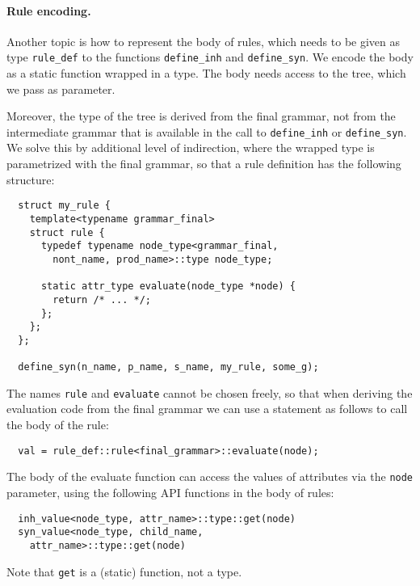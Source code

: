 \documentclass{llncs}
\begin{document}
  \paragraph{Rule encoding.}
  Another topic is how to represent the body of rules, which
  needs to be given as type \lstinline$rule_def$ to the
  functions \lstinline$define_inh$ and \lstinline$define_syn$.
  We encode the body as a static function wrapped in a type.
  The body needs access to the tree, which we pass as parameter.

  Moreover, the type of the tree is derived from the final
  grammar, not from the intermediate grammar that is available
  in the call to \lstinline$define_inh$ or \lstinline$define_syn$.
  We solve this by additional level of indirection, where the
  wrapped type is parametrized with the final grammar, so that
  a rule definition has the following structure:
  \begin{lstlisting}
  struct my_rule {
    template<typename grammar_final>
    struct rule {
      typedef typename node_type<grammar_final,
        nont_name, prod_name>::type node_type;

      static attr_type evaluate(node_type *node) {
        return /* ... */;
      };
    };
  };

  define_syn(n_name, p_name, s_name, my_rule, some_g);
  \end{lstlisting}
  The names \lstinline$rule$ and \lstinline$evaluate$
  cannot be chosen freely, so that when deriving the
  evaluation code from the final grammar
  we can use a statement as follows to call the
  body of the rule:
  \begin{lstlisting}
  val = rule_def::rule<final_grammar>::evaluate(node);
  \end{lstlisting}

  The body of the evaluate function can access the
  values of attributes via the \lstinline$node$
  parameter, using the following API functions
  in the body of rules:
  \begin{lstlisting}
  inh_value<node_type, attr_name>::type::get(node)
  syn_value<node_type, child_name,
    attr_name>::type::get(node)
  \end{lstlisting}
  Note that \lstinline$get$ is a (static) function,
  not a type.
\end{document}
